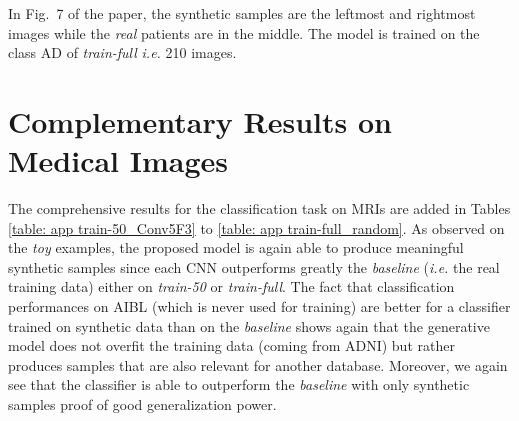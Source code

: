 \documentclass[10pt,journal,compsoc]{IEEEtran}
\begin{document}
In Fig.~7 of the paper, the synthetic samples are the leftmost and rightmost images while the \emph{real} patients are in the middle. The model is trained on the class AD of \emph{train-full} \emph{i.e.} 210 images.

\section{Complementary Results on Medical Images}\label{appendix I}

The comprehensive results for the classification task on MRIs are added in Tables \ref{table: app train-50_Conv5F3} to \ref{table: app train-full_random}. As observed on the \emph{toy} examples, the proposed model is again able to produce meaningful synthetic samples since each CNN outperforms greatly the \emph{baseline} (\emph{i.e.} the real training data) either on \emph{train-50} or \emph{train-full}. The fact that classification performances on AIBL (which is never used for training) are better for a classifier trained on synthetic data than on the \emph{baseline} shows again that the generative model does not overfit the training data (coming from ADNI) but rather produces samples that are also relevant for another database. Moreover, we again see that the classifier is able to outperform the \emph{baseline} with only synthetic samples proof of good generalization power.
\end{document}
